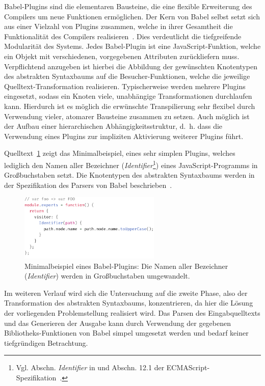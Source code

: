 Babel-Plugins sind die elementaren Bausteine, die eine flexible Erweiterung des Compilers um neue Funktionen ermöglichen. Der Kern von Babel selbst setzt sich aus einer Vielzahl von Plugins zusammen, welche in ihrer Gesamtheit die Funktionalität des Compilers realisieren~\autocite{BABEL}. Dies verdeutlicht die tiefgreifende Modularität des Systems. Jedes Babel-Plugin ist eine JavaScript-Funktion, welche ein Objekt mit verschiedenen, vorgegebenen Attributen zurückliefern muss. Verpflichtend anzugeben ist hierbei die Abbildung der gewünschten Knotentypen des abstrakten Syntaxbaums auf die Besucher-Funktionen, welche die jeweilige Quelltext-Transformation realisieren. Typischerweise werden mehrere Plugins eingesetzt, sodass ein Knoten viele, unabhängige Transformationen durchlaufen kann. Hierdurch ist es möglich die erwünschte Transpilierung sehr flexibel durch Verwendung vieler, atomarer Bausteine zusammen zu setzen. Auch möglich ist der Aufbau einer hierarchischen Abhängigkeitsstruktur, d.~h. dass die Verwendung eines Plugins zur impliziten Aktivierung weiterer Plugins führt.

Quelltext~\ref{code:babel-plugin-definition} zeigt das Minimalbeispiel, eines sehr simplen Plugins, welches lediglich den Namen aller Bezeichner (\textit{Identifier}\footnote{Vgl. Abschn. \textit{Identifier} in \autocite{BABEL_PARSER_SPEC} und Abschn. 12.1 der ECMAScript-Spezifikation~\autocite[187\psqq]{ECMASCRIPT:2019}.}) eines JavaScript-Programms in Großbuchstaben setzt. Die Knotentypen des abstrakten Syntaxbaums werden in der Spezifikation des Parsers von Babel beschrieben~\autocite{BABEL_PARSER_SPEC}.


\begin{figure}[tbp]
  \includegraphics[width=0.6\textwidth]{src/2_Grundlagen/fig/minimal-babel-plugin.pdf}
  \caption[Minimalbeispiel eines Babel-Plugins]{Minimalbeispiel eines Babel-Plugins: Die Namen aller Bezeichner (\textit{Identifier}) werden in Großbuchstaben umgewandelt.}
  \label{code:babel-plugin-definition}
\end{figure}


Im weiteren Verlauf wird sich die Untersuchung auf die zweite Phase, also der Transformation des abstrakten Syntaxbaums, konzentrieren, da hier die Lösung der vorliegenden Problemstellung realisiert wird. Das Parsen des Eingabquelltexts und das Generieren der Ausgabe kann durch Verwendung der gegebenen Bibliotheks-Funktionen von Babel simpel umgesetzt werden und bedarf keiner tiefgründigen Betrachtung.
